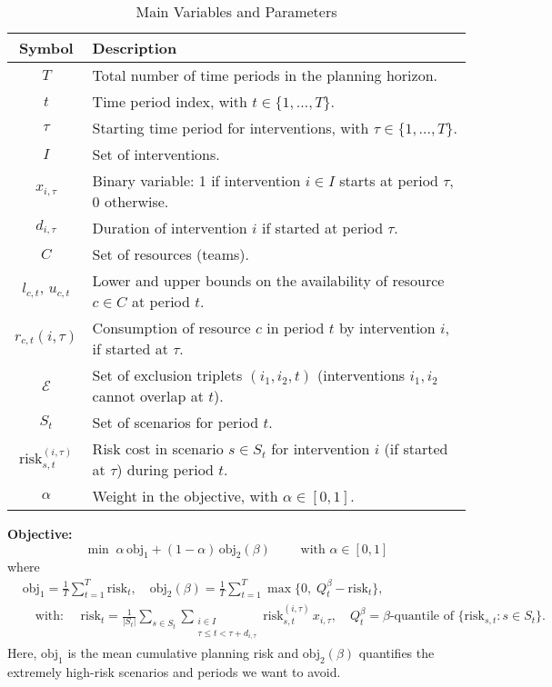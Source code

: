 \begin{table}[h]
  \centering
  \begin{tabular}{|c|p{13cm}|}
    \hline
    \textbf{Symbol} & \textbf{Description} \\ \hline
    $T$ & Total number of time periods in the planning horizon. \\ \hline
    $t$ & Time period index, with $t \in \{1,\ldots,T\}$. \\ \hline
    $\tau$ & Starting time period for interventions, with $\tau \in \{1,\ldots,T\}$. \\ \hline
    $I$ & Set of interventions. \\ \hline
    $x_{i,\tau}$ & Binary variable: 1 if intervention $i\in I$ starts at period $\tau$, 0 otherwise. \\ \hline
    $d_{i,\tau}$ & Duration of intervention $i$ if started at period $\tau$. \\ \hline
    $C$ & Set of resources (teams). \\ \hline
    $l_{c,t},\, u_{c,t}$ & Lower and upper bounds on the availability of resource $c\in C$ at period $t$. \\ \hline
    $r_{c,t}(i,\tau)$ & Consumption of resource $c$ in period $t$ by intervention $i$, if started at $\tau$. \\ \hline
    $\mathcal{E}$ & Set of exclusion triplets $(i_1,i_2,t)$ (interventions $i_1,i_2$ cannot overlap at $t$). \\ \hline
    $S_t$ & Set of scenarios for period $t$. \\ \hline
    $\mathrm{risk}_{s,t}^{(i,\tau)}$ & Risk cost in scenario $s\in S_t$ for intervention $i$ (if started at $\tau$) during period $t$. \\ \hline
    $\alpha$ & Weight in the objective, with $\alpha\in[0,1]$. \\ \hline
  \end{tabular}
  \caption{Main Variables and Parameters}
  \label{tab:variables}
\end{table}

\vspace{1em}


\noindent\textbf{Objective:}
\begin{equation}
\min \; \alpha\,\mathrm{obj}_1 + (1-\alpha)\,\mathrm{obj}_2(\beta) \qquad \text{ with }\alpha \in [0,1]
\label{eq:objective}
\end{equation}
where
\[
\begin{aligned}
&\mathrm{obj}_1 = \frac{1}{T}\sum_{t=1}^{T} \mathrm{risk}_t,\quad \mathrm{obj}_2(\beta) = \frac{1}{T}\sum_{t=1}^{T} \max\Big\{0,\;Q_t^\beta-\mathrm{risk}_t\Big\},\\[1ex]
&\quad\text{with: }\quad\mathrm{risk}_t = \frac{1}{|S_t|}\sum_{s\in S_t}\sum_{\substack{i\in I\\ \tau \le t < \tau+d_{i,\tau}}} \mathrm{risk}_{s,t}^{(i,\tau)}\,x_{i,\tau},\quad Q_t^\beta=\beta\text{-quantile of } \Big\{\mathrm{risk}_{s,t} : s\in S_t\Big\}.
\end{aligned}
\]
\noindent Here, $\mathrm{obj}_1$ is the mean cumulative planning risk and $\mathrm{obj}_2(\beta)$ quantifies the extremely high-risk scenarios and periods we want to avoid.

